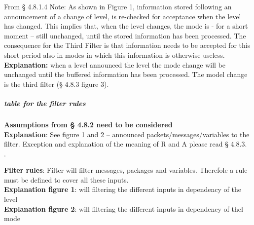 From § 4.8.1.4 Note: As shown in Figure 1, information stored following an announcement of a change of level, is re-checked for acceptance when the level has changed. This implies that, when the level changes, the mode is - for a short moment – still unchanged, until the stored information has been processed. The consequence for the Third Filter is that information needs to be accepted for this short period also in modes in which this information is otherwise useless.\\
\textbf{Explanation:} when a level announced the level the mode change will be unchanged until the buffered information has been processed. The model change is the third filter (§ 4.8.3 figure 3).\\

\subparagraph{table for the filter rules}
\textbf{Assumptions from § 4.8.2 need to be considered}\\
\textbf{Explanation}: See figure 1 and 2 – announced packets/messages/variables to the filter. Exception and explanation of the meaning of R and A please read § 4.8.3.\\. 

\textbf {Filter rules}: Filter will filter messages, packages and variables. Therefole a rule must be defined to cover all these inputs.\\

\textbf {Explanation figure 1}: will filtering the different inputs in dependency of the level\\
\textbf {Explanation figure 2}: will filtering the different inputs in dependency of thel mode\\

